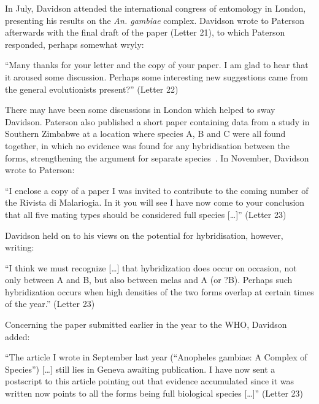 \documentclass[a4paper,11pt,abstracton,hidelinks]{scrartcl}
\begin{document}
In July, Davidson attended the international congress of entomology in London, presenting his results on the \textit{An. gambiae} complex.
%
Davidson wrote to Paterson afterwards with the final draft of the paper (Letter 21), to which Paterson responded, perhaps somewhat wryly:


\begin{displayquote}
``Many thanks for your letter and the copy of your paper. I am glad to hear that it aroused some discussion. Perhaps some interesting new suggestions came from the general evolutionists present?'' (Letter 22)
\end{displayquote}


There may have been some discussions in London which helped to sway Davidson.
%
Paterson also published a short paper containing data from a study in Southern Zimbabwe at a location where species A, B and C were all found together, in which no evidence was found for any hybridisation between the forms, strengthening the argument for separate species~\parencite{Paterson1964}.
%
In November, Davidson wrote to Paterson:


\begin{displayquote}
``I enclose a copy of a paper I was invited to contribute to the coming number of the Rivista di Malariogia. In it you will see I have now come to your conclusion that all five mating types should be considered full species [\ldots]'' (Letter 23)
\end{displayquote}


Davidson held on to his views on the potential for hybridisation, however, writing:


\begin{displayquote}
``I think we must recognize [\ldots] that hybridization does occur on occasion, not only between A and B, but also between melas and A (or ?B). Perhaps such hybridization occurs when high densities of the two forms overlap at certain times of the year.'' (Letter 23)
\end{displayquote}


Concerning the paper submitted earlier in the year to the WHO, Davidson added:


\begin{displayquote}
``The article I wrote in September last year (``Anopheles gambiae: A Complex of Species'') [\ldots] still lies in Geneva awaiting publication. I have now sent a postscript to this article pointing out that evidence accumulated since it was written now points to all the forms being full biological species [\ldots]'' (Letter 23)
\end{displayquote}
\end{document}
